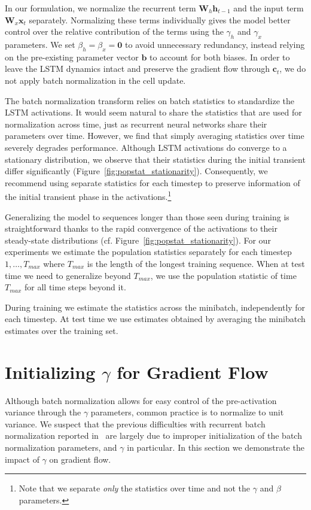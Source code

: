 \documentclass{article} %
\newcommand{\vect}[1]{\mathbf{#1}}
\newcommand{\mat}[1]{\mathbf{#1}}
\begin{document}
In our formulation, we normalize the recurrent term $\mat{W}_h \vect{h}_{t-1}$
and the input term $\mat{W}_x \vect{x}_t$ separately.  Normalizing these terms
individually gives the model better control over the relative contribution of
the terms using the $\gamma_h$ and $\gamma_x$ parameters.  We set $\beta_h =
\beta_x = \vect{0}$ to avoid unnecessary redundancy, instead relying on the
pre-existing parameter vector $\vect{b}$ to account for both biases.  In order
to leave the LSTM dynamics intact and preserve the gradient flow through
$\vect{c}_t$, we do not apply batch normalization in the cell update.

The batch normalization transform relies on batch statistics to standardize the
LSTM activations.  It would seem natural to share the statistics that are used
for normalization across time, just as recurrent neural networks share their
parameters over time.  However, we find that simply averaging statistics over
time severely degrades performance.  Although LSTM activations do converge to a
stationary distribution, we observe that their statistics during the initial
transient differ significantly (Figure~\ref{fig:popstat_stationarity}).
Consequently, we recommend using separate statistics for each timestep to
preserve information of the initial transient phase in the
activations.\footnote{ Note that we separate \emph{only} the statistics over
time and not the $\gamma$ and $\beta$ parameters.}

Generalizing the model to sequences longer than those seen during training is
straightforward thanks to the rapid convergence of the activations to their
steady-state distributions (cf. Figure~\ref{fig:popstat_stationarity}).  For
our experiments we estimate the population statistics separately for each
timestep $1, \ldots, T_{max}$ where $T_{max}$ is the length of the longest
training sequence.  When at test time we need to generalize beyond $T_{max}$,
we use the population statistic of time $T_{max}$ for all time steps beyond it.

During training we estimate the statistics across the minibatch, independently
for each timestep.  At test time we use estimates obtained by averaging the
minibatch estimates over the training set.


\section{Initializing $\gamma$ for Gradient Flow}
\label{sec:activation-variance}

Although batch normalization allows for easy control of the pre-activation
variance through the $\gamma$ parameters, common practice is to normalize to
unit variance.  We suspect that the previous difficulties with recurrent batch
normalization reported in~\citet{cesar,baidu} are largely due to improper
initialization of the batch normalization parameters, and $\gamma$ in
particular.  In this section we demonstrate the impact of $\gamma$ on gradient
flow.
\end{document}
